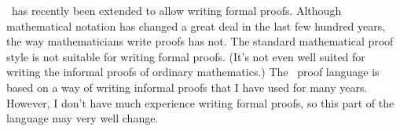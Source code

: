 \documentclass[fleqn,leqno]{article}
\begin{document}
\tlaplus\ has recently been extended to allow writing formal proofs.
Although mathematical notation has changed a great deal in the last
few hundred years, the way mathematicians write proofs has not.  The
standard mathematical proof style is not suitable for writing formal
proofs.  (It's not even well suited for writing the informal proofs of
ordinary mathematics.)  The \tlaplus\ proof language is based on a way
of writing informal proofs that I have used for many years.  However,
I don't have much experience writing formal proofs, so this part of
the language may very well change.
\end{document}
